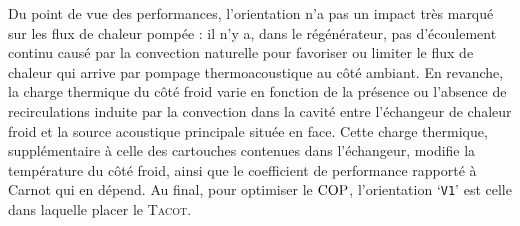 Du point de vue des performances, l'orientation n'a pas un impact très marqué sur les flux de chaleur pompée : il n'y a, dans le régénérateur, pas d'écoulement continu causé par la convection naturelle pour favoriser ou limiter le flux de chaleur qui arrive par pompage thermoacoustique au côté ambiant. En revanche, la charge thermique du côté froid varie en fonction de la présence ou l'absence de recirculations induite par la convection dans la cavité entre l'échangeur de chaleur froid et la source acoustique principale située en face. Cette charge thermique, supplémentaire à celle des cartouches contenues dans l'échangeur, modifie la température du côté froid, ainsi que le coefficient de performance rapporté à Carnot qui en dépend. Au final, pour optimiser le $\mathrm{COP}$, l'orientation `\texttt{V1}' est celle dans laquelle placer le \textsc{Tacot}.
